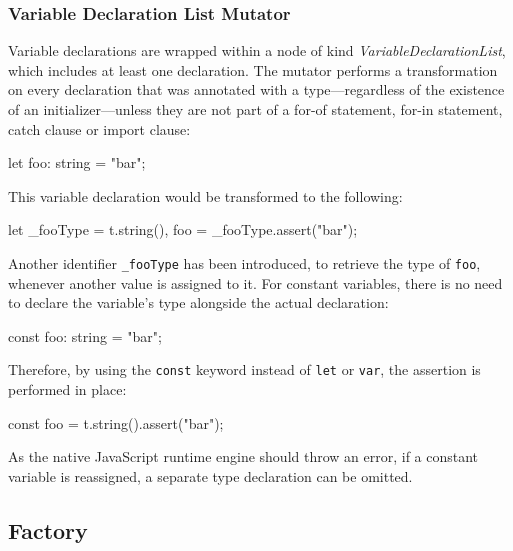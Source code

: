 \subsubsection{Variable Declaration List Mutator}

Variable declarations are wrapped within a node of kind \emph{VariableDeclarationList}, which includes at least one declaration. The mutator performs a transformation on every declaration that was annotated with a type---regardless of the existence of an initializer---unless they are not part of a for-of statement, for-in statement, catch clause or import clause:
\begin{JsCode}[numbers=none]
let foo: string = "bar";
\end{JsCode}
This variable declaration would be transformed to the following:
\begin{JsCode}[numbers=none]
let _fooType = t.string(), foo = _fooType.assert("bar");
\end{JsCode}
Another identifier \texttt{\_fooType} has been introduced, to retrieve the type of \texttt{foo}, whenever another value is assigned to it. For constant variables, there is no need to declare the variable's type alongside the actual declaration:
\begin{JsCode}[numbers=none]
const foo: string = "bar";
\end{JsCode}
Therefore, by using the \texttt{const} keyword instead of \texttt{let} or \texttt{var}, the assertion is performed in place:
\begin{JsCode}[numbers=none]
const foo = t.string().assert("bar");
\end{JsCode}
As the native JavaScript runtime engine should throw an error, if a constant variable is reassigned, a separate type declaration can be omitted.



\subsection{Factory}

